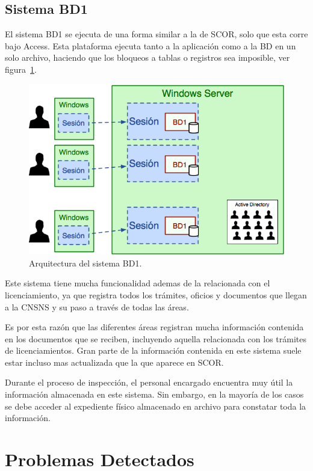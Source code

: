 \documentclass[10pt]{book}
\begin{document}
\subsection{Sistema BD1}

	El sistema BD1 se ejecuta de una forma similar a la de SCOR, solo que esta corre bajo Access. Esta plataforma ejecuta tanto a la aplicación como a la BD en un solo archivo, haciendo que los bloqueos a tablas o registros sea imposible, ver figura~\ref{fig:bd1}.
	
\begin{figure}[htbp!]
	\begin{center}
		\includegraphics[width=.7\textwidth]{images/bd1}
		\caption{Arquitectura del sistema BD1.}
		\label{fig:bd1}
	\end{center}
\end{figure}
	

	Este sistema tiene mucha funcionalidad ademas de la relacionada con el licenciamiento, ya que registra todos los trámites, oficios y documentos que llegan a la CNSNS y su paso a través de todas las áreas.
	
	Es por esta razón que las diferentes áreas registran mucha información contenida en los documentos que se reciben, incluyendo aquella relacionada con los trámites de licenciamientos. Gran parte de la información contenida en este sistema suele estar incluso mas actualizada que la que aparece en SCOR.
	
	Durante el proceso de inspección, el personal encargado encuentra muy útil la información almacenada en este sistema. Sin embargo, en la mayoría de los casos se debe acceder al expediente físico almacenado en archivo para constatar toda la información.


\section{Problemas Detectados}
	
\end{document}

